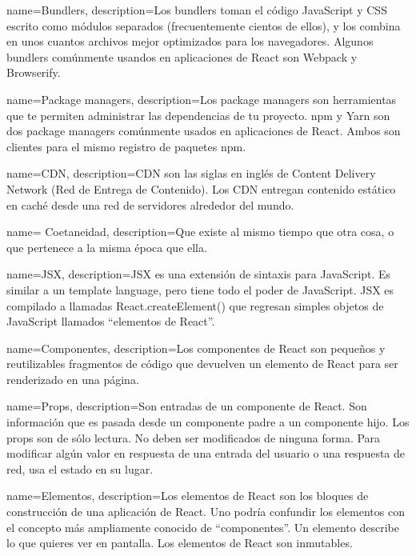 {
    name=Bundlers,
    description={Los bundlers toman el código JavaScript y CSS escrito como módulos separados (frecuentemente cientos de ellos), y los combina en unos cuantos archivos mejor optimizados para los navegadores. Algunos bundlers comúnmente usandos en aplicaciones de React son Webpack y Browserify. }
}

{
    name=Package managers,
    description={Los package managers son herramientas que te permiten administrar las dependencias de tu proyecto. npm y Yarn son dos package managers comúnmente usados en aplicaciones de React. Ambos son clientes para el mismo registro de paquetes npm. }
}
 
{
    name=CDN,
    description={CDN son las siglas en inglés de Content Delivery Network (Red de Entrega de Contenido). Los CDN entregan contenido estático en caché desde una red de servidores alrededor del mundo. }
}

{
    name= Coetaneidad,
    description={Que existe al mismo tiempo que otra cosa, o que pertenece a la misma época que ella.}
}



{
    name=JSX,
    description={JSX es una extensión de sintaxis para JavaScript. Es similar a un template language, pero tiene todo el poder de JavaScript. JSX es compilado a llamadas React.createElement() que regresan simples objetos de JavaScript llamados “elementos de React”.  }
}

{
    name=Componentes,
    description={Los componentes de React son pequeños y reutilizables fragmentos de código que devuelven un elemento de React para ser renderizado en una página.  }
}

{
    name=Props,
    description={Son entradas de un componente de React. Son información que es pasada desde un componente padre a un componente hijo. Los props son de sólo lectura. No deben ser modificados de ninguna forma. Para modificar algún valor en respuesta de una entrada del usuario o una respuesta de red, usa el estado en su lugar.
  }
}


{
    name=Elementos,
    description={Los elementos de React son los bloques de construcción de una aplicación de React. Uno podría confundir los elementos con el concepto más ampliamente conocido de “componentes”. Un elemento describe lo que quieres ver en pantalla. Los elementos de React son inmutables.  }
}

